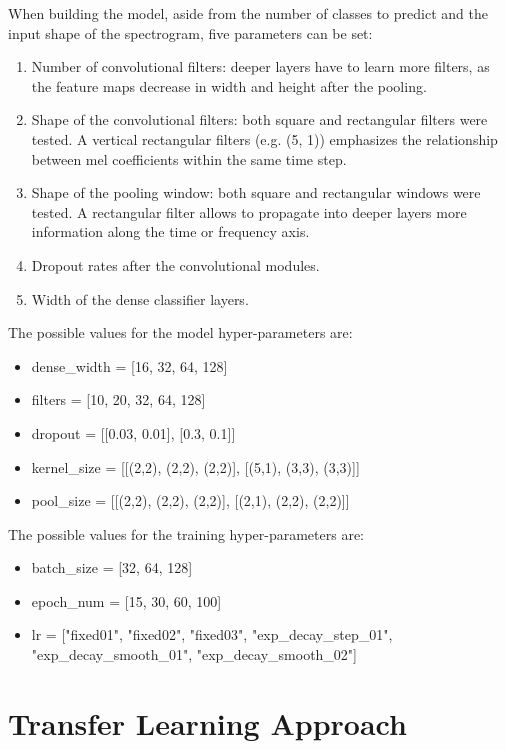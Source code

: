 When building the model, aside from the number of classes to predict and the
input shape of the spectrogram, five parameters can be set:
\begin{enumerate}
    \item Number of convolutional filters: deeper layers have to learn more
        filters, as the feature maps decrease in width and height after the
        pooling.
    \item Shape of the convolutional filters:
        both square and rectangular filters were tested.
        A vertical rectangular filters (e.g. (5, 1)) emphasizes the
        relationship between mel coefficients within the same time step.
    \item Shape of the pooling window: both square and rectangular windows were
        tested. A rectangular filter allows to propagate into deeper layers
        more information along the time or frequency axis.
    \item Dropout rates after the convolutional modules.
    \item Width of the dense classifier layers.
\end{enumerate}
The possible values for the model hyper-parameters are:
\begin{itemize}
    \item dense\_width = [16, 32, 64, 128]
    \item filters = [10, 20, 32, 64, 128]
    \item dropout = [[0.03, 0.01],  [0.3, 0.1]]
    \item kernel\_size = [[(2,2), (2,2), (2,2)], [(5,1), (3,3), (3,3)]]
    \item pool\_size = [[(2,2), (2,2), (2,2)], [(2,1), (2,2), (2,2)]]
\end{itemize}
The possible values for the training hyper-parameters are:
\begin{itemize}
    \item batch\_size = [32, 64, 128]
    \item epoch\_num = [15, 30, 60, 100]
    \item lr = ["fixed01", "fixed02", "fixed03",
        "exp\_decay\_step\_01", "exp\_decay\_smooth\_01",
    "exp\_decay\_smooth\_02"]
\end{itemize}

\section{Transfer Learning Approach}
\label{sec:transfer_learning}

